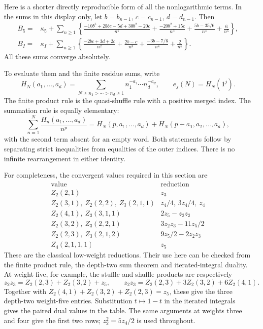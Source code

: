 Here is a shorter directly reproducible form of all the nonlogarithmic
terms.  In the sums in this display only, let
$b=b_{n-1}$, $c=c_{n-1}$, $d=d_{n-1}$.  Then
\begin{align}
 B_5={}&\kappa_5+\sum_{n\geq1}\left\{
 \frac{-10b^3+20bc-5d+30b^2-20c}{n^2}
 +\frac{-20b^2+15c}{n^3}
 +\frac{5b-35/6}{n^4}+\frac6{n^5}\right\},
 \label{q5:B5sum}\\
 B_I={}&\kappa_I+\sum_{n\geq1}\left\{
 \frac{-2bc+3d+2c}{n^2}+\frac{2b-c}{n^3}
 +\frac{-3b-7/6}{n^4}+\frac2{n^5}\right\}.
 \label{q5:BIsum}
\end{align}
All these sums converge absolutely.

To evaluate them and the finite residue sums, write
\[
 H_N(a_1,\ldots,a_d)=
    \sum_{N\geq n_1>\cdots>n_d\geq1}
                 n_1^{-a_1}\cdots n_d^{-a_d},
 \qquad e_j(N)=H_N(1^j).
\]
The finite product rule is the quasi-shuffle rule with a positive merged
index.  The summation rule is equally elementary:
\begin{equation}\label{q5:finite-prefix}
 \sum_{n=1}^N\frac{H_n(a_1,\ldots,a_d)}{n^p}
   =H_N(p,a_1,\ldots,a_d)
      +H_N(p+a_1,a_2,\ldots,a_d),
\end{equation}
with the second term absent for an empty word.  Both statements follow
by separating strict inequalities from equalities of the outer indices.
There is no infinite rearrangement in either identity.

For completeness, the convergent values required in this section are
\begin{equation}\label{q5:MZVtable}
\begin{array}{c|c}
\text{value}&\text{reduction}\\\hline
Z_2(2,1)&z_3\\
Z_2(3,1),\ Z_2(2,2),\ Z_3(2,1,1)&z_4/4,\ 3z_4/4,\ z_4\\
Z_2(4,1),\ Z_3(3,1,1)&2z_5-z_2z_3\\
Z_2(3,2),\ Z_3(2,2,1)&3z_2z_3-11z_5/2\\
Z_2(2,3),\ Z_3(2,1,2)&9z_5/2-2z_2z_3\\
Z_4(2,1,1,1)&z_5
\end{array}
\end{equation}
These are the classical low-weight reductions.  Their use here can be
checked from the finite product rule, the depth-two sum theorem and
iterated-integral duality.  At weight five, for example, the stuffle
and shuffle products are respectively
\[
 z_2z_3=Z_2(2,3)+Z_2(3,2)+z_5,
 \qquad
 z_2z_3=Z_2(2,3)+3Z_2(3,2)+6Z_2(4,1).
\]
Together with
$Z_2(4,1)+Z_2(3,2)+Z_2(2,3)=z_5$, these give the three
depth-two weight-five entries.  Substitution $t\mapsto1-t$ in the
iterated integrals gives the paired dual values in the table.
The same arguments at weights three and four give the first two rows;
$z_2^2=5z_4/2$ is used throughout.

